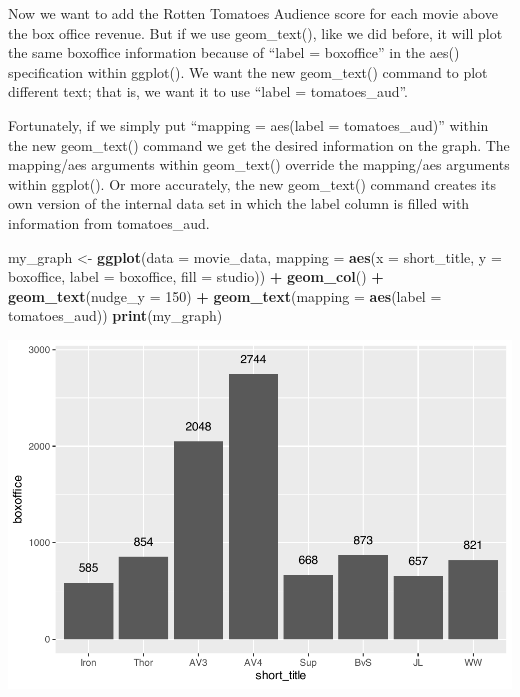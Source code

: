 \documentclass[
]{krantz}
\makeatletter
\newenvironment{Shaded}{\begin{snugshade}}{\end{snugshade}}
\newcommand{\DataTypeTok}[1]{\textcolor[rgb]{0.27,0.27,0.27}{#1}}
\newcommand{\DecValTok}[1]{\textcolor[rgb]{0.06,0.06,0.06}{#1}}
\newcommand{\KeywordTok}[1]{\textcolor[rgb]{0.27,0.27,0.27}{\textbf{#1}}}
\newcommand{\NormalTok}[1]{#1}
\newcommand{\OperatorTok}[1]{\textcolor[rgb]{0.43,0.43,0.43}{\textbf{#1}}}
\newcommand{\StringTok}[1]{\textcolor[rgb]{0.5,0.5,0.5}{#1}}
\newenvironment{kframe}{%
\medskip{}
\setlength{\fboxsep}{.8em}
 \def\at@end@of@kframe{}%
 \ifinner\ifhmode%
  \def\at@end@of@kframe{\end{minipage}}%
  \begin{minipage}{\columnwidth}%
 \fi\fi%
 \def\FrameCommand##1{\hskip\@totalleftmargin \hskip-\fboxsep
 \colorbox{shadecolor}{##1}\hskip-\fboxsep
     \hskip-\linewidth \hskip-\@totalleftmargin \hskip\columnwidth}%
 \MakeFramed {\advance\hsize-\width
   \@totalleftmargin\z@ \linewidth\hsize
   \@setminipage}}%
 {\par\unskip\endMakeFramed%
 \at@end@of@kframe}
\renewenvironment{Shaded}{\begin{kframe}}{\end{kframe}}
\makeatother
\begin{document}
Now we want to add the Rotten Tomatoes Audience score for each movie above the box office revenue. But if we use geom\_text(), like we did before, it will plot the same boxoffice information because of ``label = boxoffice'' in the aes() specification within ggplot(). We want the new geom\_text() command to plot different text; that is, we want it to use ``label = tomatoes\_aud''.

Fortunately, if we simply put ``mapping = aes(label = tomatoes\_aud)'' within the new geom\_text() command we get the desired information on the graph. The mapping/aes arguments within geom\_text() override the mapping/aes arguments within ggplot(). Or more accurately, the new geom\_text() command creates its own version of the internal data set in which the label column is filled with information from tomatoes\_aud.

\begin{Shaded}
\begin{Highlighting}[]
\NormalTok{my_graph <-}\StringTok{ }\KeywordTok{ggplot}\NormalTok{(}\DataTypeTok{data =}\NormalTok{ movie_data,}
           \DataTypeTok{mapping =} \KeywordTok{aes}\NormalTok{(}\DataTypeTok{x =}\NormalTok{ short_title,}
                         \DataTypeTok{y =}\NormalTok{ boxoffice,}
                         \DataTypeTok{label =}\NormalTok{ boxoffice, }
                         \DataTypeTok{fill =}\NormalTok{ studio)) }\OperatorTok{+}
\StringTok{  }\KeywordTok{geom_col}\NormalTok{() }\OperatorTok{+}
\StringTok{  }\KeywordTok{geom_text}\NormalTok{(}\DataTypeTok{nudge_y =} \DecValTok{150}\NormalTok{)  }\OperatorTok{+}
\StringTok{  }\KeywordTok{geom_text}\NormalTok{(}\DataTypeTok{mapping =} \KeywordTok{aes}\NormalTok{(}\DataTypeTok{label =}\NormalTok{ tomatoes_aud)) }
\KeywordTok{print}\NormalTok{(my_graph)}
\end{Highlighting}
\end{Shaded}

\includegraphics[width=0.65\linewidth]{bookdown_files/figure-latex/unnamed-chunk-113-1}
\end{document}
